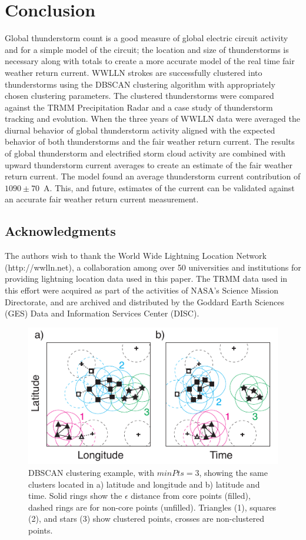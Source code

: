 \section{Conclusion}

Global thunderstorm count is a good measure of global electric circuit activity and for a simple model of the circuit; the location and size of thunderstorms is necessary along with totals to create a more accurate model of the real time fair weather return current.
WWLLN strokes are successfully clustered into thunderstorms using the DBSCAN clustering algorithm with appropriately chosen clustering parameters.
The clustered thunderstorms were compared against the TRMM Precipitation Radar and a case study of thunderstorm tracking and evolution.
When the three years of WWLLN data were averaged the diurnal behavior of global thunderstorm activity aligned with the expected behavior of both thunderstorms and the fair weather return current.
The results of global thunderstorm and electrified storm cloud activity are combined with upward thunderstorm current averages to create an estimate of the fair weather return current.
The model found an average thunderstorm current contribution of $1090 \pm 70$~A.
This, and future, estimates of the current can be validated against an accurate fair weather return current measurement.

\subsection*{Acknowledgments}
The authors wish to thank the World Wide Lightning Location Network (http://wwlln.net), a collaboration among over 50 universities and institutions for providing lightning location data used in this paper.
The TRMM data used in this effort were acquired as part of the activities of NASA's Science Mission Directorate, and are archived and distributed by the Goddard Earth Sciences (GES) Data and Information Services Center (DISC).

 \begin{figure}[ht!]
    \centering
    \includegraphics[scale=1]{GEC/Figures/dbscan.pdf} 
    \caption{DBSCAN clustering example, with $minPts = 3$, showing the same clusters located in a) latitude and longitude and b) latitude and time.
    		 Solid rings show the $\epsilon$ distance from core points (filled), dashed rings are for non-core points (unfilled).
		 Triangles (1), squares (2), and stars (3) show clustered points, crosses are non-clustered points.}
    \label{dbscan}
 \end{figure}
 
